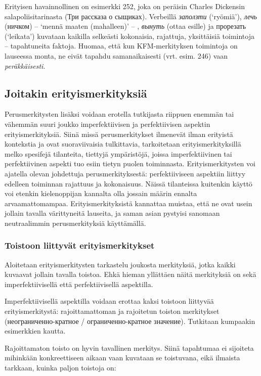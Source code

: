 \documentclass[]{scrartcl}
\begin{document}
Erityisen havainnollinen on esimerkki 252, joka on peräisin Charles
Dickensin salapoliisitarinasta (Три рассказа о сыщиках). Verbeillä
\emph{заползти} (`ryömiä'), \emph{лечь} (ничком) -- `mennä maaten
(mahalleen)' -- , \emph{вынуть} (ottaa esille) ja прорезать (`leikata')
kuvataan kaikilla selkeästi kokonaisia, rajattuja, yksittäisiä
toimintoja -- tapahtuneita faktoja. Huomaa, että kun KFM-merkityksen
toimintoja on lauseessa monta, ne eivät tapahdu samanaikaisesti (vrt.
esim. 246) vaan \emph{peräkkäisesti}.

\subsection{Joitakin
erityismerkityksiä}\label{joitakin-erityismerkityksiuxe4}

Perusmerkitysten lisäksi voidaan erotella tutkijasta riippuen enemmän
tai vähemmän suuri joukko imperfektiivisen ja perfektiivisen aspektin
erityismerkityksiä. Siinä missä perusmerkitykset ilmenevät ilman
erityistä kontekstia ja ovat suoraviivaisia tulkittavia, tarkoitetaan
erityismerkityksillä melko spesifejä tilanteita, tiettyjä ympäristöjä,
joissa imperfektiivinen tai perfektiivinen aspekti tuo esiin tietyn
puolen toiminnasta. Erityismerkitysten voi ajatella olevan johdettuja
perusmerkityksestä: perfektiiviseen aspektiin liittyy edelleen toiminnan
rajattuus ja kokonaisuus. Näissä tilanteissa kuitenkin käyttö voi
etenkin kielenoppijan kannalta olla jossain määrin ennalta
arvaamattomampaa. Erityismerkityksistä kannattaa muistaa, että ne ovat
usein jollain tavalla värittyneitä lauseita, ja saman asian pystyisi
sanomaan neutraalimmin perusmerkityksiä käyttämällä.

\subsubsection{Toistoon liittyvät
erityismerkitykset}\label{toistoon-liittyvuxe4t-erityismerkitykset}

Aloitetaan erityismerkitysten tarkastelu joukosta merkityksiä, jotka
kaikki kuvaavat jollain tavalla toistoa. Ehkä hieman yllättäen näitä
merkityksiä on sekä imperfektiivisellä että perfektiivisellä aspektilla.

Imperfektiivisellä aspektilla voidaan erottaa kaksi toistoon liittyvää
erityismerkitystä: rajoittamattoman ja rajoitetun toiston merkitykset
(неограниченно-кратное / ограниченно-кратное значение). Tutkitaan
kumpaakin esimerkkien kautta.

Rajoittamaton toisto on hyvin tavallinen merkitys. Siinä tapahtumaa ei
sijoiteta mihinkään konkreettiseen aikaan vaan kuvataan se toistuvana,
eikä ilmaista tarkkaan, kuinka paljon toistoja on:
\end{document}
